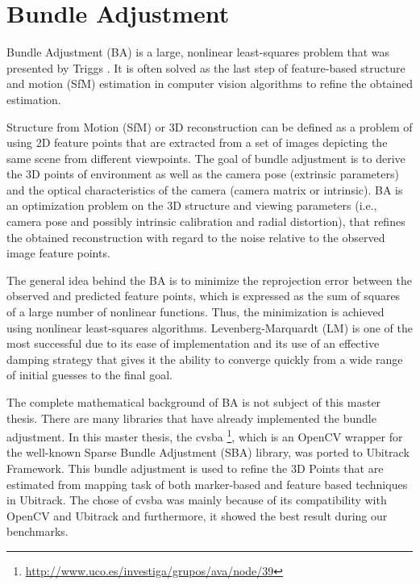 \chapter{Bundle Adjustment}\label{chapter:Bundle Adjustment}
Bundle Adjustment (BA) is a large, nonlinear least-squares problem that was presented by Triggs \cite{triggs2000bundle}. It is often solved as the last step of feature-based structure and motion (SfM) estimation in computer vision algorithms to refine the obtained estimation.

Structure from Motion (SfM) or 3D reconstruction can be defined as a problem of using 2D feature points that are extracted from a set of images depicting the same scene from different viewpoints. The goal of bundle adjustment is to derive the 3D points of environment as well as the camera pose (extrinsic parameters) and the optical characteristics of the camera (camera matrix or intrinsic). BA is an optimization problem on the 3D structure and viewing parameters (i.e., camera pose and possibly intrinsic calibration and radial distortion), that refines the obtained reconstruction with regard to the noise relative to the observed image feature points.

The general idea behind the BA is to minimize the reprojection error between the observed and predicted feature points, which is expressed as the sum of squares of a large number of nonlinear functions. Thus, the minimization is achieved using nonlinear least-squares algorithms. Levenberg-Marquardt (LM) is one of the most successful due to its ease of implementation and its use of an effective damping strategy that gives it the ability to converge quickly from a wide range of initial guesses to the final goal.

The complete mathematical background of BA is not subject of this master thesis. There are many libraries that have already implemented the bundle adjustment. In this master thesis, the cvsba \footnote{\url{http://www.uco.es/investiga/grupos/ava/node/39}}, which is an OpenCV wrapper for the well-known Sparse Bundle Adjustment (SBA) library, was ported to Ubitrack Framework. This bundle adjustment is used to refine the 3D Points that are estimated from mapping task of both marker-based and feature based techniques in Ubitrack. The chose of cvsba was mainly because of its compatibility with OpenCV and Ubitrack and furthermore, it showed the best result during our benchmarks.

